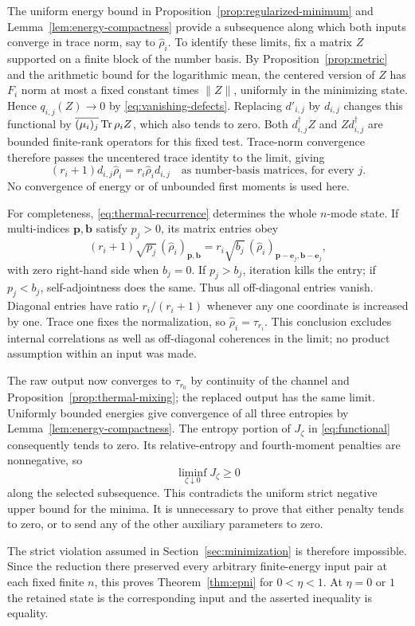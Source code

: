 The uniform energy bound in Proposition~\ref{prop:regularized-minimum}
and Lemma~\ref{lem:energy-compactness} provide a subsequence along which
both inputs converge in trace norm, say to $\widehat\rho_i$.
To identify these limits, fix a matrix $Z$ supported on a finite block of
the number basis.  By Proposition~\ref{prop:metric} and the arithmetic
bound for the logarithmic mean, the centered version of $Z$ has
$F_i$ norm at most a fixed constant times $\|Z\|$, uniformly in the
minimizing state.  Hence $q_{i,j}(Z)\to0$ by
\eqref{eq:vanishing-defects}.  Replacing $d'_{i,j}$ by $d_{i,j}$ changes
this functional by $\overline{(\mu_i)_j}\operatorname{Tr}\rho_iZ$, which also tends
to zero.  Both $d_{i,j}^\dagger Z$ and $Zd_{i,j}^\dagger$ are bounded
finite-rank operators for this fixed test.  Trace-norm convergence
therefore passes the uncentered trace identity to the limit, giving
\begin{equation}\label{eq:thermal-recurrence}
 (r_i+1)d_{i,j}\widehat\rho_i=r_i\widehat\rho_id_{i,j}
 \quad\text{as number-basis matrices, for every }j.
\end{equation}
No convergence of energy or of unbounded first moments is used here.

For completeness, \eqref{eq:thermal-recurrence} determines the whole
$n$-mode state.  If multi-indices $\mathbf p,\mathbf b$ satisfy $p_j>0$,
its matrix entries obey
\[
 (r_i+1)\sqrt{p_j}\,
   (\widehat\rho_i)_{\mathbf p,\mathbf b}
 =r_i\sqrt{b_j}\,
   (\widehat\rho_i)_{\mathbf p-\mathbf e_j,\mathbf b-\mathbf e_j},
\]
with zero right-hand side when $b_j=0$.
If $p_j>b_j$, iteration kills the entry; if $p_j<b_j$, self-adjointness
does the same.  Thus all off-diagonal entries vanish.
Diagonal entries have ratio $r_i/(r_i+1)$ whenever any one coordinate
is increased by one.  Trace one fixes the normalization, so
$\widehat\rho_i=\tau_{r_i}$.
This conclusion excludes internal correlations as well as off-diagonal
coherences in the limit; no product assumption within an input was made.

The raw output now converges to $\tau_{r_0}$ by continuity of the channel
and Proposition~\ref{prop:thermal-mixing}; the replaced output has the
same limit.  Uniformly bounded energies give convergence of all three
entropies by Lemma~\ref{lem:energy-compactness}.  The entropy portion of
$J_\zeta$ in \eqref{eq:functional} consequently tends to zero.
Its relative-entropy and fourth-moment penalties are nonnegative, so
\[
 \liminf_{\zeta\downarrow0}J_\zeta\ge0
\]
along the selected subsequence.  This contradicts the uniform strict
negative upper bound for the minima.  It is unnecessary to prove that
either penalty tends to zero, or to send any of the other auxiliary
parameters to zero.

The strict violation assumed in Section~\ref{sec:minimization} is therefore
impossible.  Since the reduction there preserved every arbitrary
finite-energy input pair at each fixed finite $n$, this proves
Theorem~\ref{thm:epni} for $0<\eta<1$.  At $\eta=0$ or $1$ the retained
state is the corresponding input and the asserted inequality is equality.
